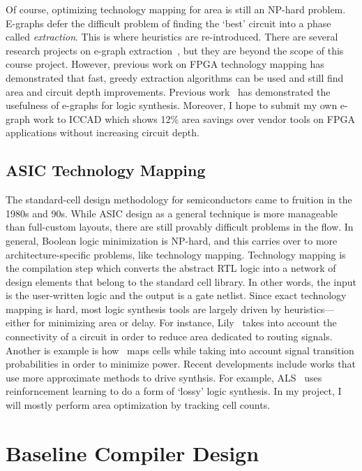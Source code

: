 \documentclass[10pt,letterpaper]{article}
\begin{document}
Of course, optimizing technology mapping for area is still an NP-hard problem.
E-graphs defer the difficult problem of finding the `best' circuit into a phase
called \textit{extraction}. This is where heuristics are re-introduced. There
are several research projects on e-graph
extraction~\cite{smoothe,sparsextract}, but they are beyond the scope of this
course project. However, previous work on FPGA technology mapping has
demonstrated that fast, greedy extraction algorithms can be used and still find
area and circuit depth improvements. Previous work~\cite{esyn} has demonstrated
the usefulness of e-graphs for logic synthesis. Moreover, I hope to submit my
own e-graph work to ICCAD which shows 12\% area savings over vendor tools on
FPGA applications without increasing circuit depth.

\subsection{ASIC Technology Mapping}\label{sec:background:techmapping}

The standard-cell design methodology for semiconductors came to fruition in the
1980s and 90s. While ASIC design as a general technique is more manageable than
full-custom layouts, there are still provably difficult problems in the flow.
In general, Boolean logic minimization is NP-hard, and this carries over to
more architecture-specific problems, like technology mapping. Technology
mapping is the compilation step which converts the abstract RTL logic into a
network of design elements that belong to the standard cell library. In other
words, the input is the user-written logic and the output is a gate netlist.
Since exact technology mapping is hard, most logic synthesis tools are largely
driven by heuristics---either for minimizing area or delay. For instance,
Lily~\cite{areamap} takes into account the connectivity of a circuit in order
to reduce area dedicated to routing signals. Another is example is
how~\cite{powermap} maps cells while taking into account signal transition
probabilities in order to minimize power. Recent developments include works
that use more approximate methods to drive synthsis. For example,
ALS~\cite{approxmap} uses reinforncement learning to do a form of `lossy' logic
synthesis. In my project, I will mostly perform area optimization by tracking
cell counts.

\section{Baseline Compiler Design}\label{sec:baseline}
\end{document}

